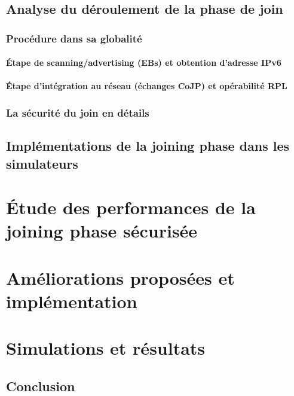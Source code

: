 \documentclass[]{report}
\begin{document}
\newpage

\section{Analyse du déroulement de la phase de join}
\label{join_phase_analysis}

\subsection{Procédure dans sa globalité}
\subsubsection{Étape de scanning/advertising (EBs) et obtention d'adresse IPv6}
\label{global_EB}

\subsubsection{Étape d'intégration au réseau (échanges CoJP) et opérabilité RPL}
\label{global_CoJP}

\subsection{La sécurité du join en détails}

\section{Implémentations de la joining phase dans les simulateurs}

\newpage

\chapter{Étude des performances de la joining phase sécurisée}
\newpage


\chapter{Améliorations proposées et implémentation}
\newpage


\chapter{Simulations et résultats}
\newpage



\section*{Conclusion}





\end{document}

